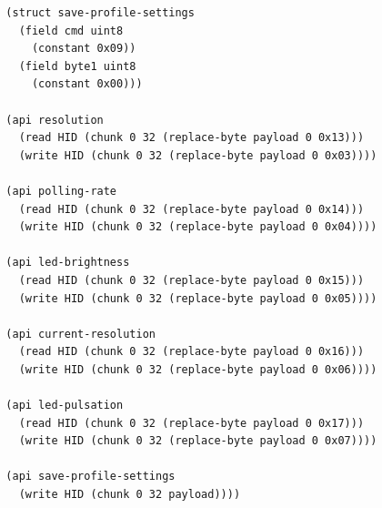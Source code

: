 \documentclass[12pt]{article}
\begin{document}
\begin{verbatim}
  (struct save-profile-settings
    (field cmd uint8
      (constant 0x09))
    (field byte1 uint8
      (constant 0x00)))

  (api resolution
    (read HID (chunk 0 32 (replace-byte payload 0 0x13)))
    (write HID (chunk 0 32 (replace-byte payload 0 0x03))))

  (api polling-rate
    (read HID (chunk 0 32 (replace-byte payload 0 0x14)))
    (write HID (chunk 0 32 (replace-byte payload 0 0x04))))

  (api led-brightness
    (read HID (chunk 0 32 (replace-byte payload 0 0x15)))
    (write HID (chunk 0 32 (replace-byte payload 0 0x05))))

  (api current-resolution
    (read HID (chunk 0 32 (replace-byte payload 0 0x16)))
    (write HID (chunk 0 32 (replace-byte payload 0 0x06))))

  (api led-pulsation
    (read HID (chunk 0 32 (replace-byte payload 0 0x17)))
    (write HID (chunk 0 32 (replace-byte payload 0 0x07))))

  (api save-profile-settings
    (write HID (chunk 0 32 payload))))
\end{verbatim}
\end{document}
